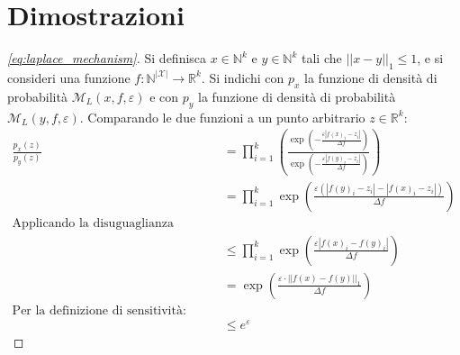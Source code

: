 \chapter{Dimostrazioni}
\begin{proof}[\ref{eq:laplace_mechanism}]
\label{proof:laplace_mechanism}
Si definisca $x \in \mathbb{N}^k$ e $y \in \mathbb{N}^k$ tali che $||x - y||_1 \le 1$, e si consideri una funzione $f \colon \mathbb{N}^{|\mathcal{X}|} \to \mathbb{R}^k$. Si indichi con $p_x$ la funzione di densità di probabilità $\mathcal{M}_L(x,f,\varepsilon)$ e con $p_y$ la funzione di densità di probabilità $\mathcal{M}_L(y,f,\varepsilon)$. Comparando le due funzioni a un punto arbitrario $z \in \mathbb{R}^k$:
\begin{align*}
    \frac{p_x(z)}{p_y(z)} &= \prod_{i = 1}^{k}\left(\frac{\exp{\left(-\frac{\varepsilon |f(x)_i - z_i|}{\Delta f}\right)}}{\exp{\left(-\frac{\varepsilon |f(y)_i - z_i|}{\Delta f}\right)}}\right)\\
    &= \prod_{i = 1}^{k}\exp{\left(\frac{\varepsilon(|f(y)_i - z_i| - |f(x)_i - z_i|)}{\Delta f}\right)}\\
    \text{Applicando la disuguaglianza triangolare:}\\
    &\le \prod_{i = 1}^{k}\exp{\left(\frac{\varepsilon|f(x)_i-f(y)_i|}{\Delta f}\right)}\\
    &= \exp{\left(\frac{\varepsilon\cdot ||f(x) - f(y)||_1}{\Delta f}\right)}\\
    \text{Per la definizione di sensitività:}\\
    &\le e^\varepsilon
\end{align*}
\end{proof}